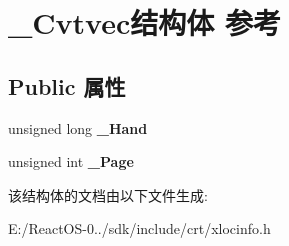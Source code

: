 \hypertarget{struct___cvtvec}{}\section{\+\_\+\+Cvtvec结构体 参考}
\label{struct___cvtvec}
\subsection*{Public 属性}
\begin{DoxyCompactItemize}
\item 
\mbox{\label{struct___cvtvec_a80cecc56f165790806e1e774fea99e12}} 
unsigned long {\bfseries \+\_\+\+Hand}
\item 
\mbox{\label{struct___cvtvec_a86a8c17bfec58c9ae74f322db0144802}} 
unsigned int {\bfseries \+\_\+\+Page}
\end{DoxyCompactItemize}


该结构体的文档由以下文件生成\+:\begin{DoxyCompactItemize}
\item 
E\+:/\+React\+O\+S-\/0../sdk/include/crt/xlocinfo.\+h\end{DoxyCompactItemize}

